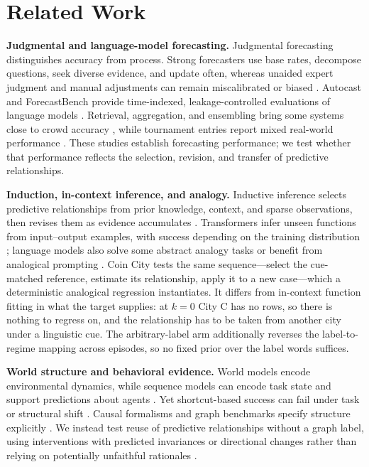 \section{Related Work}
\label{related_work}

\textbf{Judgmental and language-model forecasting.}
Judgmental forecasting distinguishes accuracy from process. Strong forecasters use
base rates, decompose questions, seek diverse evidence, and update often, whereas
unaided expert judgment and manual adjustments can remain miscalibrated or biased
\citep{tetlock2005expert,mellers2014psychological,tetlock2016superforecasting,lawrence2006judgmental}.
Autocast and ForecastBench provide time-indexed, leakage-controlled evaluations of
language models \citep{zou2022forecasting,karger2025forecastbench}. Retrieval,
aggregation, and ensembling bring some systems close to crowd accuracy
\citep{lewis2020retrieval,halawi2024approaching,schoenegger2024wisdom}, while
tournament entries report mixed real-world performance
\citep{schoenegger2023prediction}. These studies establish forecasting
performance; we test whether that performance reflects the selection, revision,
and transfer of predictive relationships.

\textbf{Induction, in-context inference, and analogy.}
Inductive inference selects predictive relationships from prior knowledge, context,
and sparse observations, then revises them as evidence accumulates
\citep{tenenbaum2006theory,griffiths2010probabilistic}. Transformers infer unseen
functions from input--output examples, with success depending on the training
distribution \citep{garg2022what,chan2022data}; language models also solve some
abstract analogy tasks or benefit from analogical prompting
\citep{webb2023emergent,yasunaga2024large}. Coin City tests the same sequence---select
the cue-matched reference, estimate its relationship, apply it to a new case---which a
deterministic analogical regression instantiates. It differs from in-context
function fitting in what the target supplies: at $k=0$ City C has no rows, so
there is nothing to regress on, and the relationship has to be taken from another
city under a linguistic cue. The arbitrary-label arm additionally reverses the
label-to-regime mapping across episodes, so no fixed prior over the label words
suffices.


\textbf{World structure and behavioral evidence.}
World models encode environmental dynamics, while sequence models can encode task
state and support predictions about agents
\citep{ha2018world,lecun2022path,li2023emergent,andreas2022agent}. Yet shortcut-based
success can fail under task or structural shift
\citep{geirhos2020shortcut,mitchell2023ai,vafa2025foundation}. Causal formalisms and
graph benchmarks specify structure explicitly
\citep{pearl2009causality,peters2017elements,jin2023cladder}. We instead test reuse of
predictive relationships without a graph label, using interventions with predicted
invariances or directional changes \citep{ribeiro2020beyond,elazar2021measuring}
rather than relying on potentially unfaithful rationales
\citep{jacovi2020towards,turpin2023language}.
